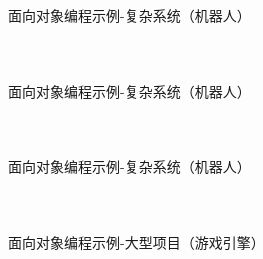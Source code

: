 \documentclass[UTF8,aspectratio=169]{beamer}
\begin{document}
\begin{frame}[fragile]{面向对象编程示例-复杂系统（机器人）}
    \begin{columns}
        \begin{column}{0.48\textwidth}
            \inputminted[firstline=1,lastline=18]{cpp}{code/oop_example_complex_system.cpp}
        \end{column}
        \begin{column}{0.48\textwidth}
            \inputminted[firstline=19,lastline=36]{cpp}{code/oop_example_complex_system.cpp}
        \end{column}
    \end{columns}
\end{frame}

\begin{frame}[fragile]{面向对象编程示例-复杂系统（机器人）}
    \begin{columns}
        \begin{column}{0.48\textwidth}
            \inputminted[firstline=37,lastline=54]{cpp}{code/oop_example_complex_system.cpp}
        \end{column}
        \begin{column}{0.48\textwidth}
            \inputminted[firstline=55,lastline=72]{cpp}{code/oop_example_complex_system.cpp}
        \end{column}
    \end{columns}
\end{frame}

\begin{frame}[fragile]{面向对象编程示例-复杂系统（机器人）}
    \begin{columns}
        \begin{column}{0.48\textwidth}
            \inputminted[firstline=73,lastline=91]{cpp}{code/oop_example_complex_system.cpp}
        \end{column}
        \begin{column}{0.48\textwidth}
            \inputminted[firstline=92,lastline=112]{cpp}{code/oop_example_complex_system.cpp}
        \end{column}
    \end{columns}
\end{frame}

\begin{frame}[fragile]{面向对象编程示例-大型项目（游戏引擎）}
    \begin{columns}
        \begin{column}{0.48\textwidth}
            \inputminted[firstline=1,lastline=20]{cpp}{code/oop_example_large_project.cpp}
        \end{column}
        \begin{column}{0.48\textwidth}
            \inputminted[firstline=21,lastline=35]{cpp}{code/oop_example_large_project.cpp}
        \end{column}
    \end{columns}
\end{frame}
\end{document}
